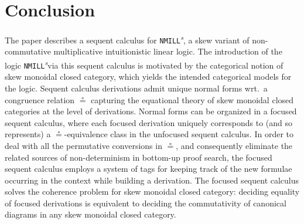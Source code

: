 \documentclass[submission,copyright,creativecommons]{eptcs}
\newtheorem{theorem}{Theorem}[section]
\theoremstyle{definition}
\newcommand{\RI}{\mathsf{RI}}
\newcommand{\NMILL}{\texttt{NMILL}}
\newcommand{\SkNMILL}{\NMILL\textsuperscript{\textit{s}}}
\begin{document}
\vspace{-.5cm}
\section{Conclusion}

The paper describes a sequent calculus for \SkNMILL, a skew variant of non-commutative multiplicative intuitionistic linear logic. The introduction of the logic \SkNMILL via this sequent calculus is motivated by the categorical notion of skew monoidal closed category, which yields the intended categorical models for the logic. Sequent calculus derivations admit unique normal forms wrt.\ a congruence relation $\circeq$ capturing the equational theory of skew monoidal closed categories at the level of derivations. Normal forms can be organized in a focused sequent calculus, where each focused derivation uniquely corresponds to (and so represents) a $\circeq$-equivalence class in the unfocused sequent calculus. In order to deal with all the permutative conversions in $\circeq$, and consequently eliminate the related sources of non-determinism in bottom-up proof search, the focused sequent calculus employs a system of tags for keeping track of the new formulae occurring in the context while building a derivation. The focused sequent calculus solves the coherence problem for skew monoidal closed category: deciding equality of focused derivations is equivalent to deciding the commutativity of canonical diagrams in any skew monoidal closed category.
\end{document}
